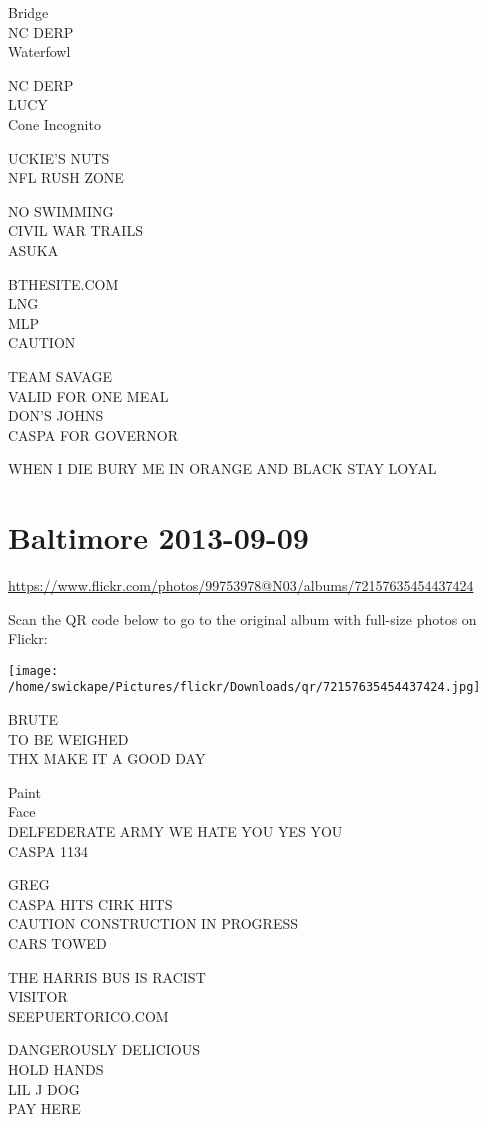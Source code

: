 \documentclass[10pt,letterpaper]{article}
\begin{document}
Bridge\\
NC DERP\\
Waterfowl

NC DERP\\
LUCY\\
Cone Incognito

UCKIE'S NUTS\\
NFL RUSH ZONE

NO SWIMMING\\
CIVIL WAR TRAILS\\
ASUKA

BTHESITE.COM\\
LNG\\
MLP\\
CAUTION

TEAM SAVAGE\\
VALID FOR ONE MEAL\\
DON'S JOHNS\\
CASPA FOR GOVERNOR

WHEN I DIE BURY ME IN ORANGE AND BLACK STAY LOYAL
\pagebreak

\section*{Baltimore 2013-09-09}

\url{https://www.flickr.com/photos/99753978@N03/albums/72157635454437424}

Scan the QR code below to go to the original album with full-size photos on Flickr:

\texttt{[image: /home/swickape/Pictures/flickr/Downloads/qr/72157635454437424.jpg]}
\pagebreak

BRUTE\\
TO BE WEIGHED\\
THX MAKE IT A GOOD DAY

Paint\\
Face\\
DELFEDERATE ARMY WE HATE YOU YES YOU\\
CASPA 1134

GREG\\
CASPA HITS CIRK HITS\\
CAUTION CONSTRUCTION IN PROGRESS\\
CARS TOWED

THE HARRIS BUS IS RACIST\\
VISITOR\\
SEEPUERTORICO.COM

DANGEROUSLY DELICIOUS\\
HOLD HANDS\\
LIL J DOG\\
PAY HERE
\end{document}
